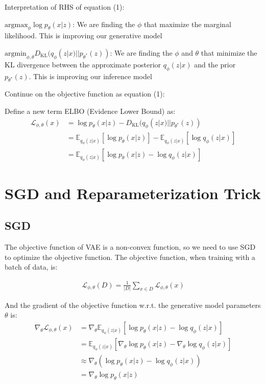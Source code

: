 \documentclass[11pt]{article}
\theoremstyle{definition}
\begin{document}
\begin{shaded}
Interpretation of RHS of equation (1):
    \begin{center}
    $\text{argmax}_{\phi} \log p_\theta(x|z)$: We are finding the $\phi$ that maximize the marginal likelihood. This is improving our generative model

    $\text{argmin}_{\phi, \theta}D_\text{KL}(q_\phi(z|x)||p_{\theta^*}(z))$: We are finding the $\phi$ and $\theta$ that minimize the KL divergence between the approximate posterior $q_\phi(z|x)$ and the prior $p_{\theta^*}(z)$. This is improving our inference model
    \end{center}
\end{shaded}

Continue on the objective function as equation (1):

Define a new term ELBO (Evidence Lower Bound) as: 
\begin{align}
    \mathcal{L}_{\phi, \theta}(x) &= \log p_\theta(x|z) - D_\text{KL}(q_\phi(z|x)||p_{\theta^*}(z))\\
    &= \mathbb{E}_{q_\phi(z|x)}[\log p_\theta(x|z)] - \mathbb{E}_{q_\phi(z|x)}[\log q_\phi(z|x)]\\
    &= \mathbb{E}_{q_\phi(z|x)}[\log p_\theta(x|z) - \log q_\phi(z|x)]
\end{align}


\section{SGD and Reparameterization Trick}

\subsection{SGD}

The objective function of VAE is a non-convex function, so we need to use SGD to optimize the objective function. The objective function, when training with a batch of data, is:

\begin{align}
    \mathcal{L}_{\phi, \theta}(D) = \frac{1}{|D|}\sum_{x \in D} \mathcal{L}_{\phi, \theta}(x)
\end{align}

And the gradient of the objective function w.r.t. the generative model parameters $\theta$ is:
\begin{align}
    \nabla_\theta \mathcal{L}_{\phi, \theta}(x) &= \nabla_\theta\mathbb{E}_{q_\phi(z|x)}[\log p_\theta(x|z) - \log q_\phi(z|x)]\\
    &= \mathbb{E}_{q_\phi(z|x)}[\nabla_\theta\log p_\theta(x|z) - \nabla_\theta\log q_\phi(z|x)]\\
    &\approx \nabla_\theta(\log p_\theta(x|z) - \log q_\phi(z|x))\\
    &= \nabla_\theta\log p_\theta(x|z)
\end{align}
\end{document}
